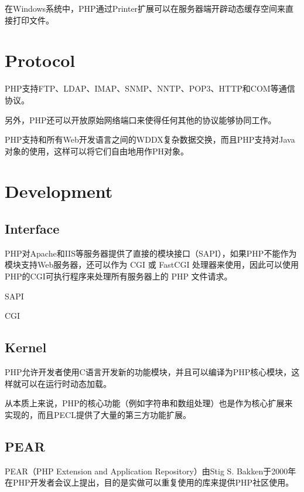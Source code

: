 在Windows系统中，PHP通过Printer扩展可以在服务器端开辟动态缓存空间来直接打印文件。



\chapter{Protocol}

PHP支持FTP、LDAP、IMAP、SNMP、NNTP、POP3、HTTP和COM等通信协议。

另外，PHP还可以开放原始网络端口来使得任何其他的协议能够协同工作。

PHP支持和所有Web开发语言之间的WDDX复杂数据交换，而且PHP支持对Java对象的使用，这样可以将它们自由地用作PH对象。







\chapter{Development}

\section{Interface}

PHP对Apache和IIS等服务器提供了直接的模块接口（SAPI），如果PHP不能作为模块支持Web服务器，还可以作为 CGI 或 FastCGI 处理器来使用，因此可以使用PHP的CGI可执行程序来处理所有服务器上的 PHP 文件请求。

\begin{compactitem}
\item SAPI
\item CGI
\end{compactitem}


\section{Kernel}


PHP允许开发者使用C语言开发新的功能模块，并且可以编译为PHP核心模块，这样就可以在运行时动态加载。

从本质上来说，PHP的核心功能（例如字符串和数组处理）也是作为核心扩展来实现的，而且PECL提供了大量的第三方功能扩展。



\section{PEAR}


PEAR（PHP Extension and Application Repository）由Stig S. Bakken于2000年在PHP开发者会议上提出，目的是实做可以重复使用的库来提供PHP社区使用。

